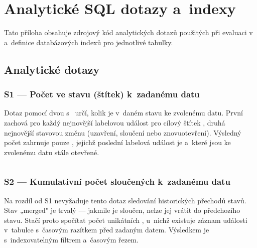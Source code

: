 \chapter{Analytické SQL dotazy a~indexy}
\label{chap:appendix:sql}

Tato příloha obsahuje zdrojový kód analytických \SQL dotazů použitých při evaluaci v~ a~definice databázových indexů pro jednotlivé tabulky.

\section{Analytické dotazy}
\label{sec:appendix:sql:queries}

\subsection*{S1 — Počet \PR ve stavu (štítek) k~zadanému datu}
\label{lst:appendix:sql:s1}

Dotaz pomocí dvou \CTE s~ určí, kolik \PR je v~daném stavu ke zvolenému datu. První \CTE {} zachová pro každý \PR nejnovější labelovou událost pro cílový štítek , druhá \CTE {} nejnovější stavovou změnu (uzavření, sloučení nebo znovuotevření). Výsledný počet zahrnuje pouze \PR, jejichž poslední labelová událost je  a~které jsou ke zvolenému datu stále otevřené.

\begin{longlisting}
  \caption{S1 --- Počet \PR ve stavu (štítek) k~zadanému datu}
  \label{lst:appendix:sql:s1:code}
  \inputminted{sql}{./code/sql/q1_pr_count_by_label.sql}
\end{longlisting}

\subsection*{S2 — Kumulativní počet sloučených \PR k~zadanému datu}
\label{lst:appendix:sql:s2}

Na rozdíl od S1 nevyžaduje tento dotaz sledování historických přechodů stavů. Stav „merged" je trvalý — jakmile je \PR sloučen, nelze jej vrátit do předchozího stavu. Stačí proto spočítat počet unikátních \PR, u~nichž existuje záznam události  v~tabulce  s~časovým razítkem před zadaným datem. Výsledkem je  s~indexovatelným filtrem  a~časovým řezem.


